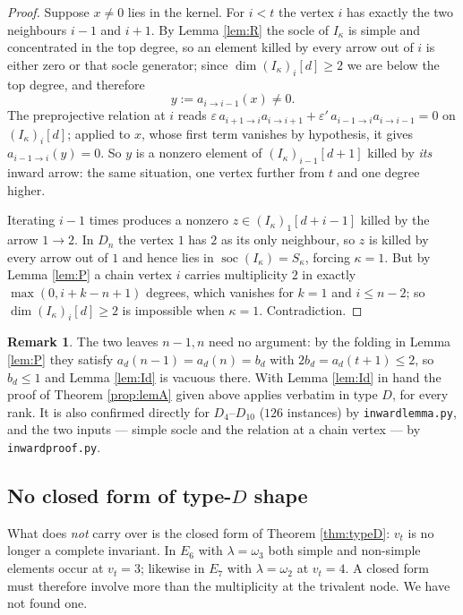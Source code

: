 \documentclass[11pt,reqno]{amsart}
\theoremstyle{plain}
\theoremstyle{definition}
\newtheorem{remark}[theorem]{Remark}
\DeclareMathOperator{\soc}{soc}
\newcommand{\om}{\omega}
\newcommand{\la}{\lambda}
\newcommand{\ka}{\kappa}
\begin{document}
\begin{proof}
Suppose $x\ne0$ lies in the kernel.  For $i<t$ the vertex $i$ has exactly the
two neighbours $i-1$ and $i+1$.  By Lemma \ref{lem:R} the socle of $I_\ka$ is
simple and concentrated in the top degree, so an element killed by every arrow
out of $i$ is either zero or that socle generator; since
$\dim (I_\ka)_i[d]\ge2$ we are below the top degree, and therefore
\[
   y:=a_{i\to i-1}(x)\ne0 .
\]
The preprojective relation at $i$ reads
$\varepsilon\, a_{i+1\to i}a_{i\to i+1}+\varepsilon'\,
a_{i-1\to i}a_{i\to i-1}=0$ on $(I_\ka)_i[d]$; applied to $x$, whose first
term vanishes by hypothesis, it gives $a_{i-1\to i}(y)=0$.  So $y$ is a nonzero
element of $(I_\ka)_{i-1}[d+1]$ killed by \emph{its} inward arrow: the same
situation, one vertex further from $t$ and one degree higher.

Iterating $i-1$ times produces a nonzero $z\in (I_\ka)_1[d+i-1]$ killed by the
arrow $1\to2$.  In $D_n$ the vertex $1$ has $2$ as its only neighbour, so $z$
is killed by every arrow out of $1$ and hence lies in $\soc(I_\ka)=S_\ka$,
forcing $\ka=1$.  But by Lemma \ref{lem:P} a chain vertex $i$ carries
multiplicity $2$ in exactly $\max(0,i+k-n+1)$ degrees, which vanishes for
$k=1$ and $i\le n-2$; so $\dim (I_\ka)_i[d]\ge2$ is impossible when $\ka=1$.
Contradiction.
\end{proof}

\begin{remark}\label{rem:Idtype}
The two leaves $n-1,n$ need no argument: by the folding in Lemma \ref{lem:P}
they satisfy $a_d(n-1)=a_d(n)=b_d$ with $2b_d=a_d(t+1)\le2$, so $b_d\le1$ and
Lemma \ref{lem:Id} is vacuous there.  With Lemma \ref{lem:Id} in hand the
proof of Theorem \ref{prop:lemA} given above applies verbatim in type $D$, for
every rank.  It is also confirmed directly for $D_4$--$D_{10}$ ($126$
instances) by \texttt{inwardlemma.py}, and the two inputs --- simple socle and
the relation at a chain vertex --- by \texttt{inwardproof.py}.
\end{remark}

\subsection{No closed form of type-$D$ shape}
What does \emph{not} carry over is the closed form of Theorem \ref{thm:typeD}:
$v_t$ is no longer a complete invariant.  In $E_6$ with $\la=\om_3$ both simple
and non-simple elements occur at $v_t=3$; likewise in $E_7$ with $\la=\om_2$ at
$v_t=4$.  A closed form must therefore involve more than the multiplicity at
the trivalent node.  We have not found one.
\end{document}

